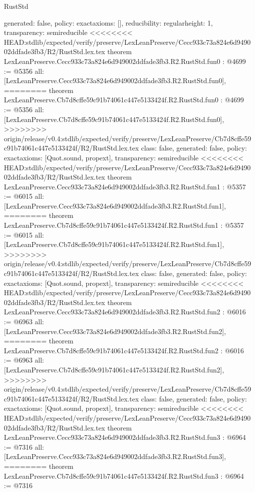\begin{lexlean}{RustStd}
\begin{coremodule}
{\begin{coremodule}
{{{  generated: false,
  policy: exact{axioms: []},
  reducibility: regular{height: 1},
  transparency: semireducible
}
<<<<<<<< HEAD:stdlib/expected/verify/preserve/LexLeanPreserve/Cecc933c73a824e6d949002ddfade3fb3/R2/RustStd.lex.tex
theorem LexLeanPreserve.Cecc933c73a824e6d949002ddfade3fb3.R2.RustStd.fun0 : @4699 := @5356 {
  all: [LexLeanPreserve.Cecc933c73a824e6d949002ddfade3fb3.R2.RustStd.fun0],
========
theorem LexLeanPreserve.Cb7d8cffe59c91b74061c447e5133424f.R2.RustStd.fun0 : @4699 := @5356 {
  all: [LexLeanPreserve.Cb7d8cffe59c91b74061c447e5133424f.R2.RustStd.fun0],
>>>>>>>> origin/release/v0.4:stdlib/expected/verify/preserve/LexLeanPreserve/Cb7d8cffe59c91b74061c447e5133424f/R2/RustStd.lex.tex
  class: false,
  generated: false,
  policy: exact{axioms: [Quot.sound, propext]},
  transparency: semireducible
}
<<<<<<<< HEAD:stdlib/expected/verify/preserve/LexLeanPreserve/Cecc933c73a824e6d949002ddfade3fb3/R2/RustStd.lex.tex
theorem LexLeanPreserve.Cecc933c73a824e6d949002ddfade3fb3.R2.RustStd.fun1 : @5357 := @6015 {
  all: [LexLeanPreserve.Cecc933c73a824e6d949002ddfade3fb3.R2.RustStd.fun1],
========
theorem LexLeanPreserve.Cb7d8cffe59c91b74061c447e5133424f.R2.RustStd.fun1 : @5357 := @6015 {
  all: [LexLeanPreserve.Cb7d8cffe59c91b74061c447e5133424f.R2.RustStd.fun1],
>>>>>>>> origin/release/v0.4:stdlib/expected/verify/preserve/LexLeanPreserve/Cb7d8cffe59c91b74061c447e5133424f/R2/RustStd.lex.tex
  class: false,
  generated: false,
  policy: exact{axioms: [Quot.sound, propext]},
  transparency: semireducible
}
<<<<<<<< HEAD:stdlib/expected/verify/preserve/LexLeanPreserve/Cecc933c73a824e6d949002ddfade3fb3/R2/RustStd.lex.tex
theorem LexLeanPreserve.Cecc933c73a824e6d949002ddfade3fb3.R2.RustStd.fun2 : @6016 := @6963 {
  all: [LexLeanPreserve.Cecc933c73a824e6d949002ddfade3fb3.R2.RustStd.fun2],
========
theorem LexLeanPreserve.Cb7d8cffe59c91b74061c447e5133424f.R2.RustStd.fun2 : @6016 := @6963 {
  all: [LexLeanPreserve.Cb7d8cffe59c91b74061c447e5133424f.R2.RustStd.fun2],
>>>>>>>> origin/release/v0.4:stdlib/expected/verify/preserve/LexLeanPreserve/Cb7d8cffe59c91b74061c447e5133424f/R2/RustStd.lex.tex
  class: false,
  generated: false,
  policy: exact{axioms: [Quot.sound, propext]},
  transparency: semireducible
}
<<<<<<<< HEAD:stdlib/expected/verify/preserve/LexLeanPreserve/Cecc933c73a824e6d949002ddfade3fb3/R2/RustStd.lex.tex
theorem LexLeanPreserve.Cecc933c73a824e6d949002ddfade3fb3.R2.RustStd.fun3 : @6964 := @7316 {
  all: [LexLeanPreserve.Cecc933c73a824e6d949002ddfade3fb3.R2.RustStd.fun3],
========
theorem LexLeanPreserve.Cb7d8cffe59c91b74061c447e5133424f.R2.RustStd.fun3 : @6964 := @7316 {
}}}}}}}
\end{coremodule}}
\end{coremodule}
\end{lexlean}
